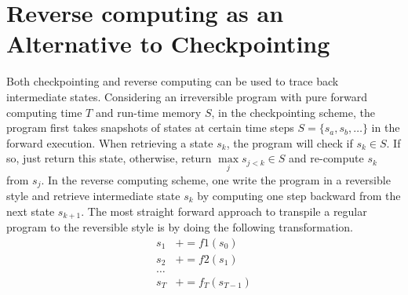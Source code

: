 \documentclass{article}
\newcommand{\<}{\langle}
\renewcommand{\>}{\rangle}
\theoremstyle{definition}\newtheorem{definition}{\textit{Definition}}
\begin{document}
\section{Reverse computing as an Alternative to Checkpointing}\label{timespace}

Both checkpointing and reverse computing can be used to trace back intermediate states.
Considering an irreversible program with pure forward computing time $T$ and run-time memory $S$, in the checkpointing scheme, the program first takes snapshots of states at certain time steps $S = \{s_{a}, s_b, \ldots\}$ in the forward execution. When retrieving a state $s_k$, the program will check if $s_k \in S$. If so, just return this state, otherwise, return $\max\limits_j s_{j<k} \in S$ and re-compute $s_k$ from $s_j$.
In the reverse computing scheme, one write the program in a reversible style and retrieve intermediate state $s_k$ by computing one step backward from the next state $s_{k+1}$.
The most straight forward approach to transpile a regular program to the reversible style is by doing the following transformation.
\begin{align*}
    s_1 &\mathrel{+}= f1(s_0)\\
    s_2 &\mathrel{+}= f2(s_1)\\
    \ldots\\
    s_T &\mathrel{+}= f_{T}(s_{T-1})
\end{align*}
\end{document}
